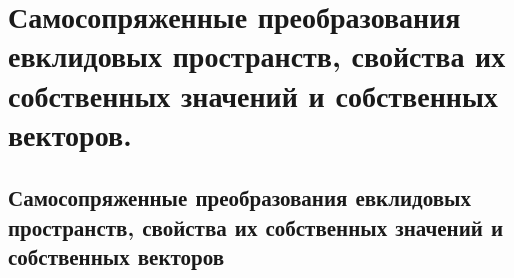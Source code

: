 \chapter{Самосопряженные преобразования евклидовых пространств, свойства их собственных значений и собственных векторов.}
\section{Самосопряженные преобразования евклидовых пространств, свойства их собственных значений и собственных векторов}